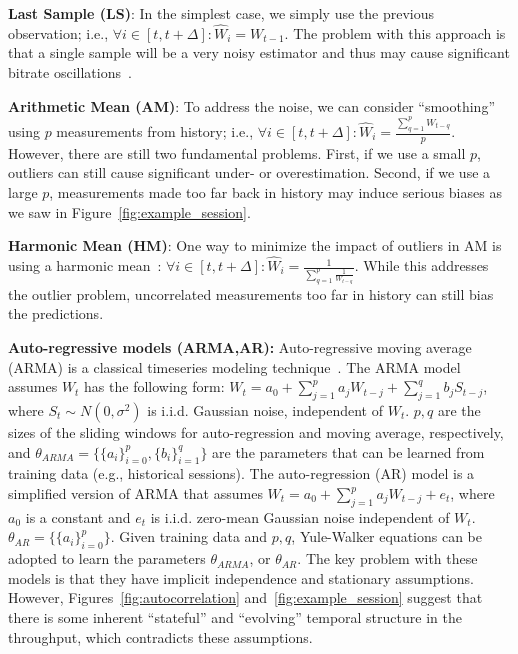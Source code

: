 \begin{packeditemize}

\item \textbf{{Last Sample} (LS)}: In the simplest case, we simply use the previous
observation; i.e., $\forall i \in [t,t+\Delta]:  \hat{W}_i=W_{t-1}$. The
problem with this approach is that a single sample will be a very noisy
estimator and thus may cause significant bitrate oscillations~\cite{yin2015controlvideo,jiang2014improving}.

\item \textbf{Arithmetic Mean (AM)}: To address the noise, we can consider
``smoothing'' using  $p$ measurements from  history; i.e.,   $ \forall i \in
[t,t+\Delta]: \hat{W}_i=\frac{\sum_{q=1}^p W_{t-q}}{p}$.  However, there are
still two fundamental problems.  First, if we use a small $p$,  outliers can
still cause significant under- or overestimation. Second, if we use a large
$p$,  measurements made too far back in history may induce serious biases as we saw in
Figure~\ref{fig:example_session}.

\item \textbf{Harmonic Mean (HM)}: One way to minimize the impact of outliers
in AM is using a harmonic mean~\cite{jiang2014improving}: $\forall i \in
[t,t+\Delta]:\hat{W}_i = \frac{1}{\sum_{q=1}^p \frac{1}{W_{t-q}}}$. While this
addresses the outlier problem, uncorrelated  measurements
too far in  history can still bias the predictions.

\item \textbf{Auto-regressive models (ARMA,AR):} Auto-regressive moving average
(ARMA)  is a classical timeseries modeling technique~\cite{tcppredictability}.
The ARMA model assumes  $W_t$ has the following form: $ W_{t} = a_0 +
\sum_{j=1}^p a_j W_{t-j} + \sum_{j=1}^q b_j S_{t-j}$, where $S_t \sim
N(0,\sigma^2)$ is i.i.d. Gaussian noise,  independent of $W_t$.  $p,q$ are the
sizes of the sliding windows for auto-regression and moving average,
respectively, and $\theta_{ARMA} = \{\{a_i\}_{i=0}^p, \{b_i\}_{i=1}^q\}$ are
the parameters that can be learned from training data (e.g., historical
sessions).  The auto-regression (AR) model is  a simplified version of ARMA
that  assumes  $W_{t} = a_0 + \sum_{j=1}^p a_j W_{t-j} + e_t$, where $a_0$ is a
constant and $e_t$ is 
i.i.d. zero-mean Gaussian noise independent of $W_t$.
$\theta_{AR} = \{\{a_i\}_{i=0}^p\}$.  Given training data and
$p,q$, Yule-Walker equations can be adopted to learn the parameters
$\theta_{ARMA}$, or $\theta_{AR}$.  The key problem with these models is that
they have implicit independence and stationary assumptions.   However,
Figures~\ref{fig:autocorrelation} and~\ref{fig:example_session} suggest that
there is some inherent ``stateful'' and ``evolving'' temporal structure in the
throughput, which contradicts these assumptions.


\end{packeditemize}


